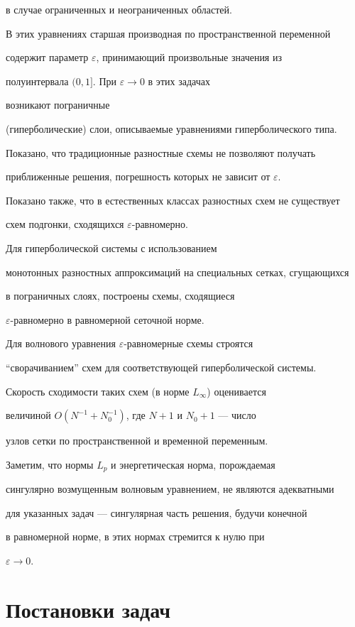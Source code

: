 в случае ограниченных и неограниченных областей.


В этих уравнениях старшая производная по пространственной переменной


содержит параметр $\varepsilon$, принимающий произвольные значения из


полуинтервала $(0,1]$. При $\varepsilon\to 0$ в этих задачах


возникают пограничные


(гиперболические) слои, описываемые уравнениями гиперболического типа.


Показано, что традиционные разностные схемы не позволяют получать


приближенные решения, погрешность которых не зависит от $\varepsilon$.


Показано также, что в естественных классах разностных схем не существует


схем подгонки, сходящихся $\varepsilon$-равномерно.





Для гиперболической системы с использованием


монотонных разностных аппроксимаций на специальных сетках, сгущающихся


в пограничных слоях, построены схемы, сходящиеся


$\varepsilon$-равномерно в равномерной сеточной норме.


Для волнового уравнения $\varepsilon$-равномерные схемы строятся


``сворачиванием'' схем для соответствующей гиперболической системы.


Скорость сходимости таких схем (в норме $L_{\infty}$) оценивается


величиной $O(N^{-1}+N_0^{-1})$, где $N+1$ и $N_0+1$ --- число


узлов сетки по пространственной и временной переменным.


Заметим, что нормы $L_p$ и энергетическая норма, порождаемая


сингулярно возмущенным волновым уравнением, не являются адекватными


для указанных задач --- сингулярная часть решения, будучи конечной


в равномерной норме, в этих нормах стремится к нулю при


$\varepsilon\to 0$.





\section{Постановки задач}



